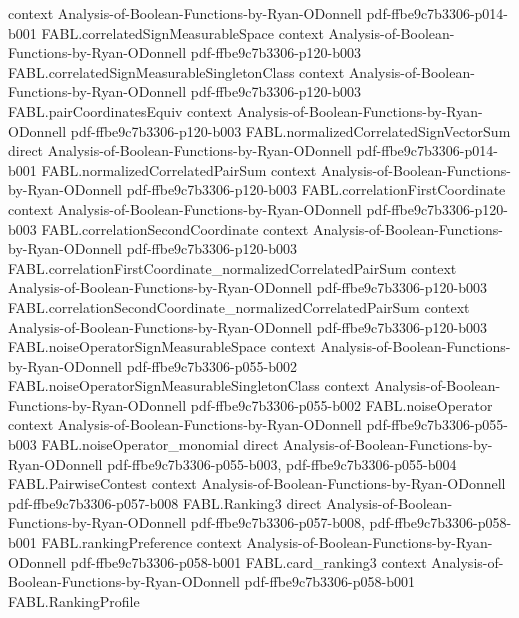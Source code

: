 \begin{theorem}
  {context}
  {Analysis-of-Boolean-Functions-by-Ryan-ODonnell}
  {pdf-ffbe9c7b3306-p014-b001}
\proofstep
  {FABL.correlatedSignMeasurableSpace}
  {context}
  {Analysis-of-Boolean-Functions-by-Ryan-ODonnell}
  {pdf-ffbe9c7b3306-p120-b003}
\proofstep
  {FABL.correlatedSignMeasurableSingletonClass}
  {context}
  {Analysis-of-Boolean-Functions-by-Ryan-ODonnell}
  {pdf-ffbe9c7b3306-p120-b003}
\proofstep
  {FABL.pairCoordinatesEquiv}
  {context}
  {Analysis-of-Boolean-Functions-by-Ryan-ODonnell}
  {pdf-ffbe9c7b3306-p120-b003}
\proofstep
  {FABL.normalizedCorrelatedSignVectorSum}
  {direct}
  {Analysis-of-Boolean-Functions-by-Ryan-ODonnell}
  {pdf-ffbe9c7b3306-p014-b001}
\proofstep
  {FABL.normalizedCorrelatedPairSum}
  {context}
  {Analysis-of-Boolean-Functions-by-Ryan-ODonnell}
  {pdf-ffbe9c7b3306-p120-b003}
\proofstep
  {FABL.correlationFirstCoordinate}
  {context}
  {Analysis-of-Boolean-Functions-by-Ryan-ODonnell}
  {pdf-ffbe9c7b3306-p120-b003}
\proofstep
  {FABL.correlationSecondCoordinate}
  {context}
  {Analysis-of-Boolean-Functions-by-Ryan-ODonnell}
  {pdf-ffbe9c7b3306-p120-b003}
\proofstep
  {FABL.correlationFirstCoordinate_normalizedCorrelatedPairSum}
  {context}
  {Analysis-of-Boolean-Functions-by-Ryan-ODonnell}
  {pdf-ffbe9c7b3306-p120-b003}
\proofstep
  {FABL.correlationSecondCoordinate_normalizedCorrelatedPairSum}
  {context}
  {Analysis-of-Boolean-Functions-by-Ryan-ODonnell}
  {pdf-ffbe9c7b3306-p120-b003}
\proofstep
  {FABL.noiseOperatorSignMeasurableSpace}
  {context}
  {Analysis-of-Boolean-Functions-by-Ryan-ODonnell}
  {pdf-ffbe9c7b3306-p055-b002}
\proofstep
  {FABL.noiseOperatorSignMeasurableSingletonClass}
  {context}
  {Analysis-of-Boolean-Functions-by-Ryan-ODonnell}
  {pdf-ffbe9c7b3306-p055-b002}
\proofstep
  {FABL.noiseOperator}
  {context}
  {Analysis-of-Boolean-Functions-by-Ryan-ODonnell}
  {pdf-ffbe9c7b3306-p055-b003}
\proofstep
  {FABL.noiseOperator_monomial}
  {direct}
  {Analysis-of-Boolean-Functions-by-Ryan-ODonnell}
  {pdf-ffbe9c7b3306-p055-b003,
    pdf-ffbe9c7b3306-p055-b004}
\proofstep
  {FABL.PairwiseContest}
  {context}
  {Analysis-of-Boolean-Functions-by-Ryan-ODonnell}
  {pdf-ffbe9c7b3306-p057-b008}
\proofstep
  {FABL.Ranking3}
  {direct}
  {Analysis-of-Boolean-Functions-by-Ryan-ODonnell}
  {pdf-ffbe9c7b3306-p057-b008,
    pdf-ffbe9c7b3306-p058-b001}
\proofstep
  {FABL.rankingPreference}
  {context}
  {Analysis-of-Boolean-Functions-by-Ryan-ODonnell}
  {pdf-ffbe9c7b3306-p058-b001}
\proofstep
  {FABL.card_ranking3}
  {context}
  {Analysis-of-Boolean-Functions-by-Ryan-ODonnell}
  {pdf-ffbe9c7b3306-p058-b001}
\proofstep
  {FABL.RankingProfile}

\end{theorem}
